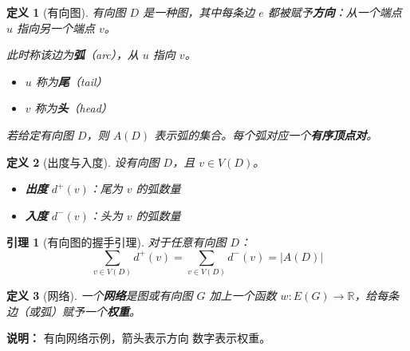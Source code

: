 \documentclass[12pt, a4paper]{article}
\newtheorem{definition}{定义}[section]
\newtheorem{lemma}{引理}[section]
\begin{document}
\begin{definition}[有向图]
有向图 $D$ 是一种图，其中每条边 $e$ 都被赋予\textbf{方向}：从一个端点 $u$ 指向另一个端点 $v$。

此时称该边为\textbf{弧}（arc），从 $u$ 指向 $v$。
\begin{itemize}
    \item $u$ 称为\textbf{尾}（tail）
    \item $v$ 称为\textbf{头}（head）
\end{itemize}

若给定有向图 $D$，则 $A(D)$ 表示弧的集合。每个弧对应一个\textbf{有序顶点对}。
\end{definition}

\begin{definition}[出度与入度]
设有向图 $D$，且 $v \in V(D)$。
\begin{itemize}
    \item \textbf{出度} $d^+(v)$：尾为 $v$ 的弧数量
    \item \textbf{入度} $d^-(v)$：头为 $v$ 的弧数量
\end{itemize}
\end{definition}

\begin{lemma}[有向图的握手引理]
对于任意有向图 $D$：
\[
\sum_{v \in V(D)} d^+(v) = \sum_{v \in V(D)} d^-(v) = |A(D)|
\]
\end{lemma}

\begin{definition}[网络]
一个\textbf{网络}是图或有向图 $G$ 加上一个函数 $w: E(G) \to \mathbb{R}$，给每条边（或弧）赋予一个\textbf{权重}。
\end{definition}

\begin{center}
\end{center}

\textbf{说明：} 有向网络示例，箭头表示方向
数字表示权重。
\end{document}
